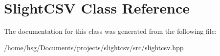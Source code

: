 \hypertarget{classSlightCSV}{}\section{Slight\+C\+SV Class Reference}
\label{classSlightCSV}


The documentation for this class was generated from the following file\+:\begin{DoxyCompactItemize}
\item 
/home/hsg/\+Documents/projects/slightcsv/src/slightcsv.\+hpp\end{DoxyCompactItemize}
